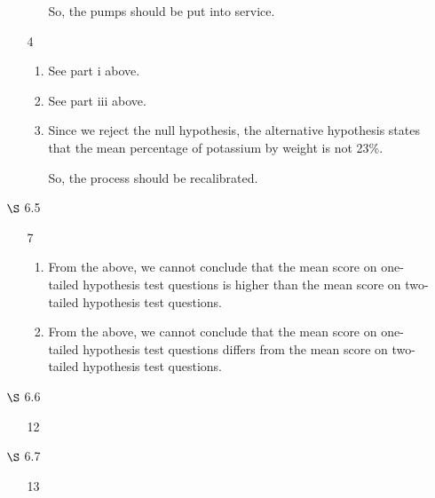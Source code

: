 \documentclass[12pt,letterpaper]{article}
\begin{document}
\begin{enumerate}
\begin{enumerate}
\begin{enumerate}[label=(\arabic*)]
              So, the pumps should be put into service.
          \end{enumerate}
        \item [4]
          \begin{enumerate}[label=(\arabic*)]
            \item See part i above.
            \item See part iii above.
            \item
              Since we reject the null hypothesis,
              the alternative hypothesis states that the mean percentage of potassium by weight is not 23\%.

              So, the process should be recalibrated.
          \end{enumerate}
      \end{enumerate}
    \item [$\S$ 6.5]
      \begin{enumerate}
        \item [7]
          \begin{enumerate}[label=(\arabic*)]
            \item

              From the above,
              we cannot conclude that the mean score on one-tailed hypothesis test questions is higher than the mean score on two-tailed hypothesis test questions.
            \item

              From the above,
              we cannot conclude that the mean score on one-tailed hypothesis test questions differs from the mean score on two-tailed hypothesis test questions.
          \end{enumerate}
      \end{enumerate}
    \item [$\S$ 6.6]
      \begin{enumerate}
        \item [12]
      \end{enumerate}
    \item [$\S$ 6.7]
      \begin{enumerate}
        \item [13]


\end{enumerate}
\end{enumerate}
\end{document}
